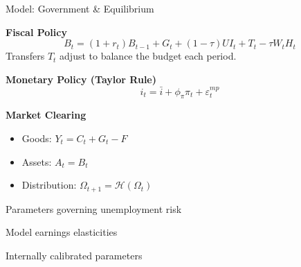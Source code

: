 \documentclass[10pt, aspectratio = 169]{beamer} %
\theoremstyle{mystyle}
\begin{document}
\begin{frame}{Model: Government \& Equilibrium}

\textbf{Fiscal Policy}
\[
B_t = (1+r_t)B_{t-1} + G_t + (1-\tau) UI_t + T_t - \tau W_t H_t
\]
Transfers $T_t$ adjust to balance the budget each period.

\textbf{Monetary Policy (Taylor Rule)}
\[
i_t = \bar{i} + \phi_\pi \pi_t + \varepsilon_t^{mp}
\]

\textbf{Market Clearing}
\begin{itemize}
    \item Goods: $Y_t = C_t + G_t - F$
    \item Assets: $A_t = B_t$
    \item Distribution: $\Omega_{t+1} = \mathcal{H}(\Omega_t)$
\end{itemize}
\hyperlink{modelsetup}{}

\end{frame}


\begin{frame}{Parameters governing unemployment risk 
}\label{table2}
\centering
\resizebox{0.7\textwidth}{!}{}

\hyperlink{calibration}{}
\end{frame}

\begin{frame}{Model earnings elasticities}
\centering
\resizebox{0.7\textwidth}{!}{}

\hyperlink{calibration}{}
\end{frame}


\begin{frame}{Internally calibrated parameters
}\label{table3}
\centering
{}

{}

\hyperlink{calibration}{}
\end{frame}
\end{document}
